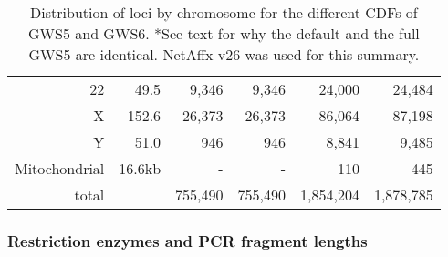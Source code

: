 \documentclass[10pt,a4paper]{article}
\begin{document}
\begin{table}[htp]
\begin{center}
\begin{tabular}{|r|r||rr||rr|}
22 &  49.5   &  9,346  &   9,346  &   24,000  &   24,484  \\
X  & 152.6   & 26,373  &  26,373  &   86,064  &   87,198  \\
Y  &  51.0   &    946  &     946  &    8,841  &    9,485  \\
\hline
Mitochondrial  &  16.6kb &      -  &       -  &      110  &      445  \\
\hline
total  &     & 755,490 &  755,490 & 1,854,204 & 1,878,785 \\
\hline
\end{tabular}
\end{center}
\caption{Distribution of loci by chromosome for the different CDFs of GWS5 and GWS6.  *See text for why the default and the full GWS5 are identical.  NetAffx v26 was used for this summary.}
\label{tblGenomicLocation}
\end{table}


\subsubsection{Restriction enzymes and PCR fragment lengths}
\end{document}
